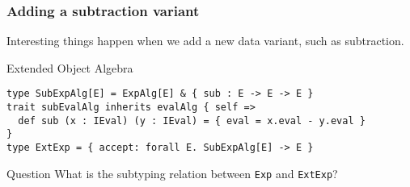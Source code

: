 \documentclass{beamer}
\begin{document}
\begin{frame}[fragile]
  \frametitle{Adding a subtraction variant}

  Interesting things happen when we add a new data variant, such as subtraction.


\begin{exampleblock}{Extended Object Algebra}
\begin{lstlisting}
type SubExpAlg[E] = ExpAlg[E] & { sub : E -> E -> E }
trait subEvalAlg inherits evalAlg { self =>
  def sub (x : IEval) (y : IEval) = { eval = x.eval - y.eval }
}
type ExtExp = { accept: forall E. SubExpAlg[E] -> E }
\end{lstlisting}
\end{exampleblock}

\pause

\begin{alertblock}{Question}
  What is the subtyping relation between \lstinline{Exp} and \lstinline{ExtExp}?
\end{alertblock}




\end{frame}
\end{document}
